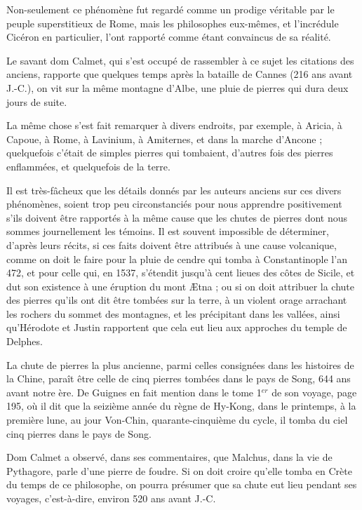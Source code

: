 \documentclass[a4paper, 12pt, oneside, french]{article}
\begin{document}
Non-seulement ce phénomène fut regardé comme un prodige véritable par le peuple superstitieux de Rome, mais les philosophes eux-mêmes, et l'incrédule Cicéron en particulier, l'ont rapporté comme étant convaincus de sa réalité.

Le savant dom Calmet, qui s'est occupé de rassembler à ce sujet les citations des anciens, rapporte que quelques temps après la bataille de Cannes (216 ans avant J.-C.), on vit sur la même montagne d'Albe, une pluie de pierres qui dura deux jours de suite.

La même chose s'est fait remarquer à divers endroits, par exemple, à Aricia, à Capoue, à Rome, à Lavinium, à Amiternes, et dans la marche d'Ancone ; quelquefois c'était de simples pierres qui tombaient, d'autres fois des pierres enflammées, et quelquefois de la terre.

Il est très-fâcheux que les détails donnés par les auteurs anciens sur ces divers phénomènes, soient trop peu circonstanciés pour nous apprendre positivement s'ils doivent être rapportés à la même cause que les chutes de pierres dont nous sommes journellement les témoins. Il est souvent impossible de déterminer, d'après leurs récits, si ces faits doivent être attribués à une cause volcanique, comme on doit le faire pour la pluie de cendre qui tomba à Constantinople l'an 472, et pour celle qui, en 1537, s'étendit jusqu'à cent lieues des côtes de Sicile, et dut son existence à une éruption du mont Ætna ; ou si on doit attribuer la chute des pierres qu'ils ont dit être tombées sur la terre, à un violent orage arrachant les rochers du sommet des montagnes, et les précipitant dans les vallées, ainsi qu'Hérodote et Justin rapportent que cela eut lieu aux approches du temple de Delphes.

La chute de pierres la plus ancienne, parmi celles consignées dans les histoires de la Chine, paraît être celle de cinq pierres tombées dans le pays de Song, 644 ans avant notre ère. De Guignes en fait mention dans le tome 1$^{er}$ de son voyage, page 195, où il dit que la seizième année du règne de Hy-Kong, dans le printemps, à la première lune, au jour Von-Chin, quarante-cinquième du cycle, il tomba du ciel cinq pierres dans le pays de Song.

Dom Calmet a observé, dans ses commentaires, que Malchus, dans la vie de Pythagore, parle d'une pierre de foudre. Si on doit croire qu'elle tomba en Crète du temps de ce philosophe, on pourra présumer que sa chute eut lieu pendant ses voyages, c'est-à-dire, environ 520 ans avant J.-C.
\end{document}
